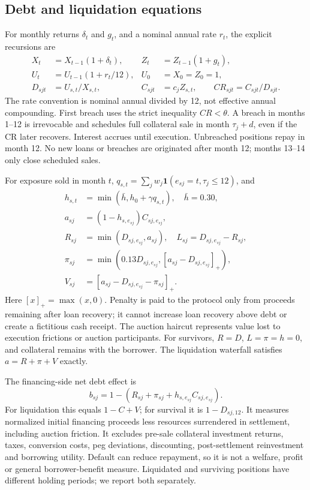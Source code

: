 \documentclass[11pt,a4paper]{article}
\newcommand{\ind}{\mathbf{1}}
\begin{document}
\subsection{Debt and liquidation equations}
For monthly returns $\delta_t$ and $g_t$, and a nominal annual rate $r_t$, the explicit recursions are
\begin{align}
X_t&=X_{t-1}(1+\delta_t),&Z_t&=Z_{t-1}(1+g_t),\\
U_t&=U_{t-1}(1+r_t/12),&U_0&=X_0=Z_0=1,\\
D_{sjt}&=U_{s,t}/X_{s,t},&C_{sjt}&=c_jZ_{s,t},\qquad CR_{sjt}=C_{sjt}/D_{sjt}.
\end{align}
The rate convention is nominal annual divided by 12, not effective annual compounding. First breach uses the strict inequality $CR<\theta$. A breach in months 1--12 is irrevocable and schedules full collateral sale in month $\tau_j+d$, even if the CR later recovers. Interest accrues until execution. Unbreached positions repay in month 12. No new loans or breaches are originated after month 12; months 13--14 only close scheduled sales.

For exposure sold in month $t$, $q_{s,t}=\sum_jw_j\ind(e_{sj}=t,\tau_j\leq12)$, and
\begin{align}
h_{s,t}&=\min(\bar h,h_0+\gamma q_{s,t}),\quad \bar h=0.30,\\
a_{sj}&=(1-h_{s,e_{sj}})C_{sj,e_{sj}},\\
R_{sj}&=\min(D_{sj,e_{sj}},a_{sj}),\quad L_{sj}=D_{sj,e_{sj}}-R_{sj},\\
\pi_{sj}&=\min(0.13D_{sj,e_{sj}},[a_{sj}-D_{sj,e_{sj}}]_+),\\
V_{sj}&=[a_{sj}-D_{sj,e_{sj}}-\pi_{sj}]_+.
\end{align}
Here $[x]_+=\max(x,0)$. Penalty is paid to the protocol only from proceeds remaining after loan recovery; it cannot increase loan recovery above debt or create a fictitious cash receipt. The auction haircut represents value lost to execution frictions or auction participants. For survivors, $R=D$, $L=\pi=h=0$, and collateral remains with the borrower. The liquidation waterfall satisfies $a=R+\pi+V$ exactly.

The financing-side net debt effect is
\begin{equation}
b_{sj}=1-\left(R_{sj}+\pi_{sj}+h_{s,e_{sj}}C_{sj,e_{sj}}\right).
\end{equation}
For liquidation this equals $1-C+V$; for survival it is $1-D_{sj,12}$. It measures normalized initial financing proceeds less resources surrendered in settlement, including auction friction. It excludes pre-sale collateral investment returns, taxes, conversion costs, peg deviations, discounting, post-settlement reinvestment and borrowing utility. Default can reduce repayment, so it is not a welfare, profit or general borrower-benefit measure. Liquidated and surviving positions have different holding periods; we report both separately.
\end{document}
